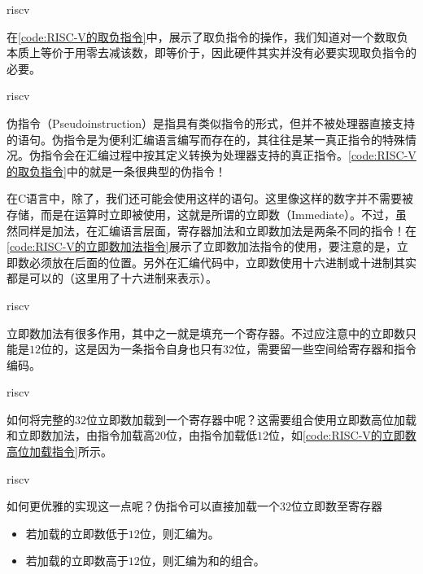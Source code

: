 \begin{Code}{riscv}
    
\end{Code}

在\cref{code:RISC-V的取负指令}中，展示了取负指令的操作，我们知道对一个数取负本质上等价于用零去减该数，即等价于，因此硬件其实并没有必要实现取负指令的必要。

\begin{Code}{riscv}
    
\end{Code}

伪指令（Pseudoinstruction）是指具有类似指令的形式，但并不被处理器直接支持的语句。伪指令是为便利汇编语言编写而存在的，其往往是某一真正指令的特殊情况。伪指令会在汇编过程中按其定义转换为处理器支持的真正指令。\cref{code:RISC-V的取负指令}中的就是一条很典型的伪指令！

在C语言中，除了，我们还可能会使用这样的语句。这里像这样的数字并不需要被存储，而是在运算时立即被使用，这就是所谓的立即数（Immediate）。不过，虽然同样是加法，在汇编语言层面，寄存器加法和立即数加法是两条不同的指令！在\cref{code:RISC-V的立即数加法指令}展示了立即数加法指令的使用，要注意的是，立即数必须放在后面的位置。另外在汇编代码中，立即数使用十六进制或十进制其实都是可以的（这里用了十六进制来表示）。
\begin{Code}{riscv}
    
\end{Code}

立即数加法有很多作用，其中之一就是填充一个寄存器。不过应注意中的立即数只能是$12$位的，这是因为一条指令自身也只有$32$位，需要留一些空间给寄存器和指令编码。
\begin{Code}{riscv}
    
\end{Code}

如何将完整的$32$位立即数加载到一个寄存器中呢？这需要组合使用立即数高位加载和立即数加法，由指令加载高$20$位，由指令加载低$12$位，如\cref{code:RISC-V的立即数高位加载指令}所示。
\begin{Code}{riscv}
    
\end{Code}

如何更优雅的实现这一点呢？伪指令可以直接加载一个$32$位立即数至寄存器
\begin{itemize}
    \item 若加载的立即数低于$12$位，则汇编为。
    \item 若加载的立即数高于$12$位，则汇编为和的组合。
\end{itemize}

